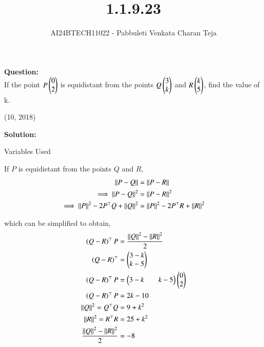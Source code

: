 \documentclass[journal]{IEEEtran}
\begin{document}

\vspace{3cm}

\title{1.1.9.23}
\author{AI24BTECH11022 - Pabbuleti Venkata Charan Teja}
\maketitle

\renewcommand{\thefigure}{\theenumi}
\renewcommand{\thetable}{\theenumi}

\textbf{Question:}\\
If the point $P\begin{pmatrix}0\\2\\\end{pmatrix}$ is equidistant from the points $Q\begin{pmatrix}3\\k\\\end{pmatrix}$ and $R\begin{pmatrix}k\\5\\\end{pmatrix}$, find the value of k.

\hfill{(10, 2018)}

\textbf{Solution:}

\begin{table}[h!]
\renewcommand{\thetable}{1}
    \centering
   
   \def\tablename{Table}
   \caption{Variables Used}
    \label{tab1.1.5.10.1}
\end{table}

If $P$ is equidistant from the points $Q$ and $R$,
\begin{align}
    \left\vert\left\vert P-Q\right\vert\right\vert&=\left\vert\left\vert P-R\right\vert\right\vert\label{eq1.1.9.23.1}\\
    \implies\left\vert\left\vert P-Q\right\vert\right\vert^{2}&=\left\vert\left\vert P-R\right\vert\right\vert^{2}\label{eq1.1.9.23.2}\\
\implies\left\vert\left\vert P\right\vert\right\vert^{2}-2P^{\top}Q+\left\vert\left\vert Q\right\vert\right\vert^{2}&=\left\vert\left\vert P\right\vert\right\vert^{2}-2P^{\top}R+\left\vert\left\vert R\right\vert\right\vert^{2}\label{eq1.1.9.23.3}
\end{align}

which can be simplified to obtain,
\begin{align}
    \left(Q-R\right)^{\top}P&=\frac{\left\vert\left\vert Q\right\vert\right\vert^{2}-\left\vert\left\vert R\right\vert\right\vert^{2}}{2}\label{eq1.1.9.23.4}\\
   \left(Q-R\right)^{\top}&=\begin{pmatrix}3-k\\k-5\\\end{pmatrix}\label{eq1.1.9.23.5}\\
   \left(Q-R\right)^{\top}P&=\begin{pmatrix}3-k && k-5\end{pmatrix}\begin{pmatrix}0\\2\\\end{pmatrix}\label{eq1.1.9.23.6}\\
   \left(Q-R\right)^{\top}P&=2k-10\label{eq1.1.9.23.7}\\
    \left\vert\left\vert Q\right\vert\right\vert^{2}=Q^{\top}Q&=9+k^{2}\label{eq1.1.9.23.8}\\
    \left\vert\left\vert R\right\vert\right\vert^{2}=R^{\top}R&=25+k^{2}\label{eq1.1.9.23.9}\\
    \frac{\left\vert\left\vert Q\right\vert\right\vert^{2}-\left\vert\left\vert R\right\vert\right\vert^{2}}{2}&=-8\label{eq1.1.9.23.10}
\end{align}
\end{document}
